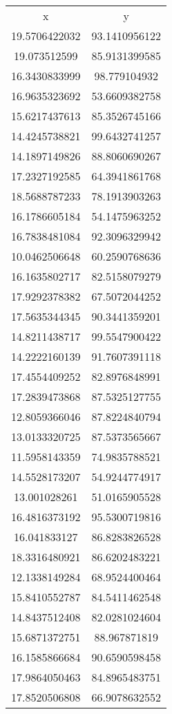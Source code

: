 \begin{table}
\begin{tabular}{cc}
x & y \\
19.5706422032 & 93.1410956122 \\
19.073512599 & 85.9131399585 \\
16.3430833999 & 98.779104932 \\
16.9635323692 & 53.6609382758 \\
15.6217437613 & 85.3526745166 \\
14.4245738821 & 99.6432741257 \\
14.1897149826 & 88.8060690267 \\
17.2327192585 & 64.3941861768 \\
18.5688787233 & 78.1913903263 \\
16.1786605184 & 54.1475963252 \\
16.7838481084 & 92.3096329942 \\
10.0462506648 & 60.2590768636 \\
16.1635802717 & 82.5158079279 \\
17.9292378382 & 67.5072044252 \\
17.5635344345 & 90.3441359201 \\
14.8211438717 & 99.5547900422 \\
14.2222160139 & 91.7607391118 \\
17.4554409252 & 82.8976848991 \\
17.2839473868 & 87.5325127755 \\
12.8059366046 & 87.8224840794 \\
13.0133320725 & 87.5373565667 \\
11.5958143359 & 74.9835788521 \\
14.5528173207 & 54.9244774917 \\
13.001028261 & 51.0165905528 \\
16.4816373192 & 95.5300719816 \\
16.041833127 & 86.8283826528 \\
18.3316480921 & 86.6202483221 \\
12.1338149284 & 68.9524400464 \\
15.8410552787 & 84.5411462548 \\
14.8437512408 & 82.0281024604 \\
15.6871372751 & 88.967871819 \\
16.1585866684 & 90.6590598458 \\
17.9864050463 & 84.8965483751 \\
17.8520506808 & 66.9078632552 \\

\end{tabular}
\end{table}
